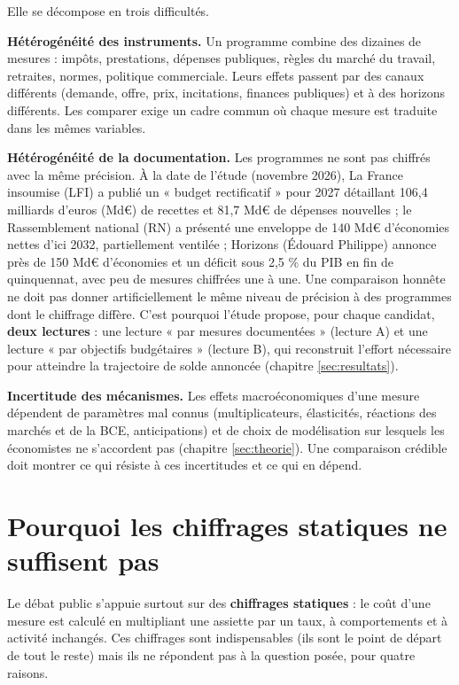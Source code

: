 \documentclass[
  11pt,
  11pt,
  a4paper,
  openany]{book}
\begin{document}
Elle se décompose en trois difficultés.

\textbf{Hétérogénéité des instruments.} Un programme combine des
dizaines de mesures : impôts, prestations, dépenses publiques, règles du
marché du travail, retraites, normes, politique commerciale. Leurs
effets passent par des canaux différents (demande, offre, prix,
incitations, finances publiques) et à des horizons différents. Les
comparer exige un cadre commun où chaque mesure est traduite dans les
mêmes variables.

\textbf{Hétérogénéité de la documentation.} Les programmes ne sont pas
chiffrés avec la même précision. À la date de l'étude (novembre 2026),
La France insoumise (LFI) a publié un « budget rectificatif » pour 2027
détaillant 106,4 milliards d'euros (Md€) de recettes et 81,7 Md€ de
dépenses nouvelles ; le Rassemblement national (RN) a présenté une
enveloppe de 140 Md€ d'économies nettes d'ici 2032, partiellement
ventilée ; Horizons (Édouard Philippe) annonce près de 150 Md€
d'économies et un déficit sous 2,5 \% du PIB en fin de quinquennat, avec
peu de mesures chiffrées une à une. Une comparaison honnête ne doit pas
donner artificiellement le même niveau de précision à des programmes
dont le chiffrage diffère. C'est pourquoi l'étude propose, pour chaque
candidat, \textbf{deux lectures} : une lecture « par mesures documentées
» (lecture A) et une lecture « par objectifs budgétaires » (lecture B),
qui reconstruit l'effort nécessaire pour atteindre la trajectoire de
solde annoncée (chapitre \ref{sec:resultats}).

\textbf{Incertitude des mécanismes.} Les effets macroéconomiques d'une
mesure dépendent de paramètres mal connus (multiplicateurs, élasticités,
réactions des marchés et de la BCE, anticipations) et de choix de
modélisation sur lesquels les économistes ne s'accordent pas (chapitre
\ref{sec:theorie}). Une comparaison crédible doit montrer ce qui résiste
à ces incertitudes et ce qui en dépend.

\hypertarget{sec:statique}{%
\section{Pourquoi les chiffrages statiques ne suffisent
pas}\label{sec:statique}}

Le débat public s'appuie surtout sur des \textbf{chiffrages statiques} :
le coût d'une mesure est calculé en multipliant une assiette par un
taux, à comportements et à activité inchangés. Ces chiffrages sont
indispensables (ils sont le point de départ de tout le reste) mais ils
ne répondent pas à la question posée, pour quatre raisons.
\end{document}
